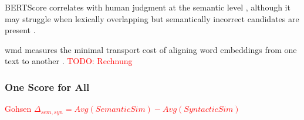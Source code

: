 

BERTScore correlates with human judgment at the semantic level \citep{kurt_pehlivanoglu_comparative_2024}, although it may struggle when lexically overlapping but semantically incorrect candidates are present \citep{hanna_fine_grained_2021}.

\ac{wmd} measures the minimal transport cost of aligning word embeddings from one text to another \citep{gohsen_captions_2023}. 
\textcolor{red}{TODO: Rechnung}


\subsubsection{One Score for All}

\textcolor{red}{Gohsen $\Delta_{sem,syn}=Avg(Semantic Sim)-Avg(Syntactic Sim)$~\citep{gohsen_captions_2023}}
